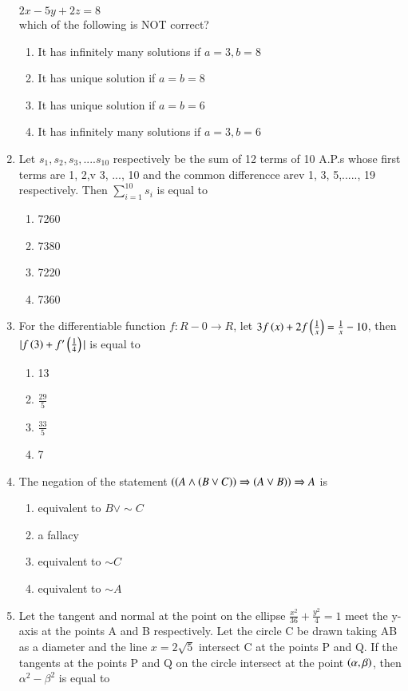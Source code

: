 \documentclass[journal,12pt,onecolumn]{IEEEtran}
\theoremstyle{remark}
\begin{document}
\begin{enumerate}
$2x - 5y +2z = 8$\\
which of the following is NOT correct?
\begin{enumerate}
    \item It has infinitely many solutions if $a=3,b=8$
    \item It has unique solution if $a=b=8$
    \item It has unique solution if $a=b=6$
    \item It has infinitely many solutions if $a=3,b=6$
\end{enumerate}
\item Let $s_1,s_2,s_3,....s_{10}$ respectively be the sum of 12 terms of 10 A.P.s whose first terms are 1, 2,v 3, ..., 10 and the common differencce arev 1, 3, 5,....., 19 respectively. Then $\sum_{i=1}^{10} s_i$ is equal to 
\begin{enumerate}
    \item 7260
    \item 7380
    \item 7220
    \item 7360
\end{enumerate}
\item For the differentiable function $f:R-{0}\rightarrow R$, let $3f\left(x\right)+2f\left(\frac{1}{x}\right)=\frac{1}{x}-10$, then $|f\left(3\right)+f^{\prime}\left(\frac{1}{4}\right)|$ is equal to
\begin{enumerate}
    \item 13
    \item $\frac{29}{5}$
    \item $\frac{33}{5}$
    \item 7
\end{enumerate}
\item The negation of the statement $\left(\left(A \land \left(B \lor C\right)\right) \Rightarrow \left(A \lor B\right)\right) \Rightarrow A $ is
\begin{enumerate}
    \item equivalent to $ B \lor \sim C $
    \item a fallacy
    \item equivalent to $ \sim C $
    \item equivalent to $ \sim A $
\end{enumerate}
\item Let the tangent and normal at the point  on the ellipse $\frac{x^2}{36}+\frac{y^2}{4}=1$ meet the y-axis at the points A and B respectively. Let the circle C be drawn taking AB as a diameter and the line $x=2\sqrt{5}$ intersect C at the points P and Q. If the tangents at the points P and Q on the circle intersect at the point $\left(\alpha,\beta\right)$, then $\alpha^2 -\beta^2$ is equal to 

\end{enumerate}
\end{document}
